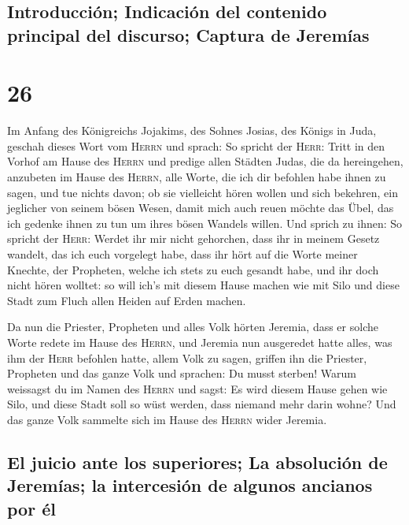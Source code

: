 \hypertarget{introducciuxf3n-indicaciuxf3n-del-contenido-principal-del-discurso-captura-de-jeremuxedas}{%
\subsection{Introducción; Indicación del contenido principal del
discurso; Captura de
Jeremías}\label{introducciuxf3n-indicaciuxf3n-del-contenido-principal-del-discurso-captura-de-jeremuxedas}}

\hypertarget{section-25}{%
\section{26}\label{section-25}}

 Im Anfang des Königreichs Jojakims, des Sohnes Josias,
des Königs in Juda, geschah dieses Wort vom \textsc{Herrn} und sprach:
 So spricht der \textsc{Herr}: Tritt in den Vorhof am
Hause des \textsc{Herrn} und predige allen Städten Judas, die da
hereingehen, anzubeten im Hause des \textsc{Herrn}, alle Worte, die ich
dir befohlen habe ihnen zu sagen, und tue nichts davon; 
ob sie vielleicht hören wollen und sich bekehren, ein jeglicher von
seinem bösen Wesen, damit mich auch reuen möchte das Übel, das ich
gedenke ihnen zu tun um ihres bösen Wandels willen.  Und
sprich zu ihnen: So spricht der \textsc{Herr}: Werdet ihr mir nicht
gehorchen, dass ihr in meinem Gesetz wandelt, das ich euch vorgelegt
habe,  dass ihr hört auf die Worte meiner Knechte, der
Propheten, welche ich stets zu euch gesandt habe, und ihr doch nicht
hören wolltet:  so will ich's mit diesem Hause machen wie
mit Silo und diese Stadt zum Fluch allen Heiden auf Erden machen.

 Da nun die Priester, Propheten und alles Volk hörten
Jeremia, dass er solche Worte redete im Hause des \textsc{Herrn},
 und Jeremia nun ausgeredet hatte alles, was ihm der
\textsc{Herr} befohlen hatte, allem Volk zu sagen, griffen ihn die
Priester, Propheten und das ganze Volk und sprachen: Du musst sterben!
 Warum weissagst du im Namen des \textsc{Herrn} und sagst:
Es wird diesem Hause gehen wie Silo, und diese Stadt soll so wüst
werden, dass niemand mehr darin wohne? Und das ganze Volk sammelte sich
im Hause des \textsc{Herrn} wider Jeremia.

\hypertarget{el-juicio-ante-los-superiores-la-absoluciuxf3n-de-jeremuxedas-la-intercesiuxf3n-de-algunos-ancianos-por-uxe9l}{%
\subsection{El juicio ante los superiores; La absolución de Jeremías; la
intercesión de algunos ancianos por
él}\label{el-juicio-ante-los-superiores-la-absoluciuxf3n-de-jeremuxedas-la-intercesiuxf3n-de-algunos-ancianos-por-uxe9l}}


